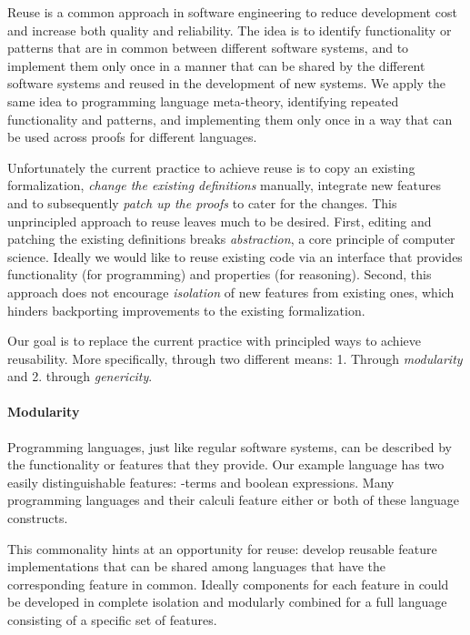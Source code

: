 {Reuse is a common approach in software engineering to reduce development cost
and increase both quality and reliability. The idea is to identify functionality
or patterns that are in common between different software systems, and to
implement them only once in a manner that can be shared by the different
software systems and reused in the development of new systems. We apply the same
idea to programming language meta-theory, identifying repeated functionality and
patterns, and implementing them only once in a way that can be used across
proofs for different languages.

Unfortunately the current practice to achieve reuse is to copy an existing
formalization, \emph{change the existing definitions} manually, integrate new
features and to subsequently \emph{patch up the proofs} to cater for the
changes. This unprincipled approach to reuse leaves much to be desired. First,
editing and patching the existing definitions breaks \emph{abstraction}, a core
principle of computer science. Ideally we would like to reuse existing code via
an interface that provides functionality (for programming) and properties (for
reasoning). Second, this approach does not encourage \emph{isolation} of new
features from existing ones, which hinders backporting improvements to the
existing formalization.

Our goal is to replace the current practice with principled ways to achieve
reusability. More specifically, through two different means: 1. Through
\emph{modularity} and 2. through \emph{genericity}.


\paragraph{Modularity}

Programming languages, just like regular software systems, can be described by
the functionality or features that they provide. Our example language \stlcbool
has two easily distinguishable features: \textlambda-terms and boolean
expressions. Many programming languages and their calculi feature either or both
of these language constructs.

This commonality hints at an opportunity for reuse: develop reusable feature
implementations that can be shared among languages that have the corresponding
feature in common. Ideally components for each feature in could be developed in
complete isolation and modularly combined for a full language consisting of a
specific set of features.

}
